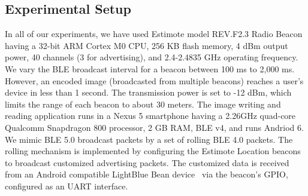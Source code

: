 


\subsection{Experimental Setup}

In all of our experiments, we have used Estimote model REV.F2.3 Radio Beacon~\cite{ESTIMOTE} having a 32-bit ARM Cortex M0 CPU, 256 KB flash memory, 4 dBm output power, 40 channels (3 for advertising), and 2.4-2.4835 GHz operating frequency. We vary the BLE broadcast interval for a beacon between 100 ms to 2,000 ms. However, an encoded image (broadcasted from multiple beacons) reaches a user's device in less than 1 second. The transmission power is set to -12 dBm, which limits the range of each beacon to about 30 meters. The image writing and reading application runs in a Nexus 5 smartphone having a 2.26GHz quad-core Qualcomm Snapdragon 800 processor, 2 GB RAM, BLE v4, and runs Andriod 6. We mimic BLE 5.0 broadcast packets by a set of rolling BLE 4.0 packets. The rolling mechanism is implemented by configuring the Estimote Location beacons to broadcast customized advertising packets. The customized data is received from an Android compatible LightBlue Bean device~\cite{LBB} via the beacon's GPIO, configured as an UART interface.




